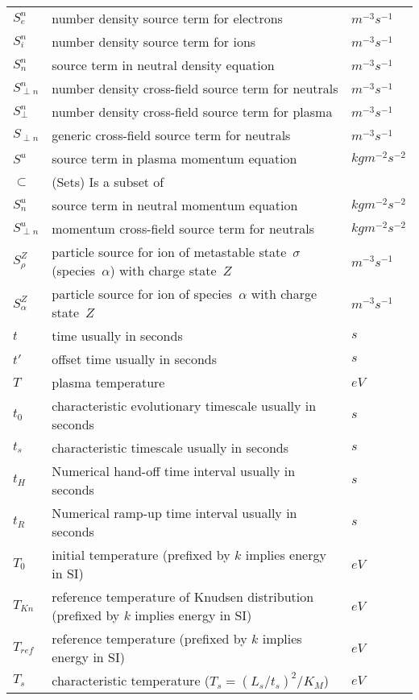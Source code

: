 \begin{longtable}{|p{3.0cm}|p{10.0cm}|p{3.0cm}|}
$S^n_{e}$ & number density source term for electrons  & $m^{-3} s^{-1}$ \\
$S^n_{i}$ & number density source term for ions  & $m^{-3} s^{-1}$ \\
$S^n_n$ & source term in neutral density equation  & $m^{-3} s^{-1}$ \\
$S^n_{\perp n}$ & number density cross-field source term for neutrals  & $m^{-3} s^{-1}$ \\
$S^n_{\perp}$ & number density cross-field source term for plasma  & $m^{-3} s^{-1}$ \\
$S_{\perp n}$ & generic cross-field source term for neutrals  & $m^{-3} s^{-1}$ \\
$S^u$ & source term in plasma momentum equation  & $kg m^{-2} s^{-2}$ \\
$\subset$ &  (Sets) Is a subset of & \\
$S^u_n$ & source term in neutral momentum equation   & $kg m^{-2} s^{-2}$ \\
$S^u_{\perp n}$ & momentum cross-field source term for neutrals  & $kg m^{-2} s^{-2}$ \\
$S^Z_\rho$ & particle source for ion of metastable state~$\sigma$ (species~$\alpha$) with charge state~$Z$  & $m^{-3} s^{-1}$ \\
$S^Z_\alpha$ & particle source for ion of species~$\alpha$ with charge state~$Z$  & $m^{-3} s^{-1}$ \\
$t$ & time usually in seconds  & $s$ \\
$t'$ & offset time usually in seconds  & $s$ \\
$T$ & plasma temperature  & $eV$ \\
$t_0$ & characteristic evolutionary timescale usually in seconds  & $s$ \\
$t_s$ & characteristic timescale usually in seconds  & $s$ \\
$t_H$ & Numerical hand-off time interval usually in seconds  & $s$ \\
$t_R$ & Numerical ramp-up time interval usually in seconds  & $s$ \\
$T_0$ & initial temperature (prefixed by $k$ implies energy in SI)  & $eV$ \\
$T_{Kn}$ & reference temperature of Knudsen distribution (prefixed by $k$ implies energy in SI)  & $eV$ \\
$T_{ref}$ & reference temperature (prefixed by $k$ implies energy in SI)  & $eV$ \\
$T_s$ & characteristic temperature ($T_s=(L_s/t_s)^2/K_M$)  & $eV$ \\

\end{longtable}
